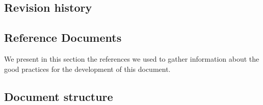 \subsection{Revision history}

\subsection{Reference Documents}
We present in this section the references we used to gather information about the good practices for the development of this document.
\begingroup
\renewcommand{\section}[2]{}%
\nocite{*}


\endgroup

\subsection{Document structure}
\label{sec:doc_struct}
